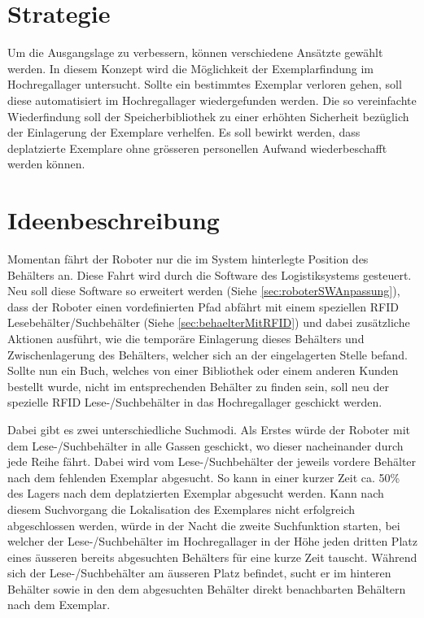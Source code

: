\section{Strategie}
Um die Ausgangslage zu verbessern, können verschiedene Ansätzte gewählt werden. In diesem Konzept wird die Möglichkeit der Exemplarfindung im Hochregallager untersucht. Sollte ein bestimmtes Exemplar verloren gehen, soll diese automatisiert im Hochregallager wiedergefunden werden. Die so vereinfachte Wiederfindung soll der Speicherbibliothek zu einer erhöhten Sicherheit bezüglich der Einlagerung der Exemplare verhelfen. Es soll bewirkt werden, dass deplatzierte Exemplare ohne grösseren personellen Aufwand wiederbeschafft werden können.

\section{Ideenbeschreibung}
Momentan fährt der Roboter nur die im System hinterlegte Position des Behälters an. Diese Fahrt wird durch die Software des Logistiksystems gesteuert. Neu soll diese Software so erweitert werden (Siehe \ref{sec:roboterSWAnpassung}), dass der Roboter einen vordefinierten Pfad abfährt mit einem speziellen RFID Lesebehälter/Suchbehälter (Siehe \ref{sec:behaelterMitRFID}) und dabei zusätzliche Aktionen ausführt, wie die temporäre Einlagerung dieses Behälters und Zwischenlagerung des Behälters, welcher sich an der eingelagerten Stelle befand.
Sollte nun ein Buch, welches von einer Bibliothek oder einem anderen Kunden bestellt wurde, nicht im entsprechenden Behälter zu finden sein, soll neu der spezielle RFID Lese-/Suchbehälter in das Hochregallager geschickt werden.

Dabei gibt es zwei unterschiedliche Suchmodi. Als Erstes würde der Roboter mit dem Lese-/Suchbehälter in alle Gassen geschickt, wo dieser nacheinander durch jede Reihe fährt. Dabei wird vom Lese-/Suchbehälter der jeweils vordere Behälter nach dem fehlenden Exemplar abgesucht. So kann in einer kurzer Zeit ca. 50\% des Lagers nach dem deplatzierten Exemplar abgesucht werden. Kann nach diesem Suchvorgang die Lokalisation des Exemplares nicht erfolgreich abgeschlossen werden, würde in der Nacht die zweite Suchfunktion starten, bei welcher der Lese-/Suchbehälter im Hochregallager in der Höhe jeden dritten Platz eines äusseren bereits abgesuchten Behälters für eine kurze Zeit tauscht. Während sich der Lese-/Suchbehälter am äusseren Platz befindet, sucht er im hinteren Behälter sowie in den dem abgesuchten Behälter direkt benachbarten Behältern nach dem Exemplar.

